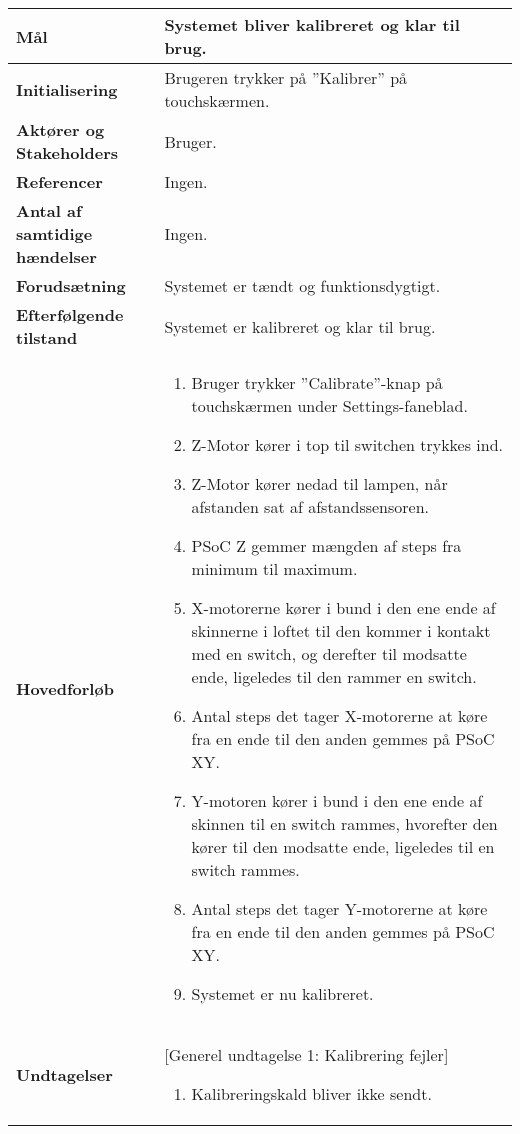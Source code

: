 \begin{center}
\begin{longtable}{|p{6cm}|p{8cm}|}
        \textbf{Mål}								
            & Systemet bliver kalibreret og klar til brug.
        \\ \hline
        \textbf{Initialisering}					
            & Brugeren trykker på ”Kalibrer” på touchskærmen.
        \\ \hline
        \textbf{Aktører og Stakeholders}			
            & Bruger.
        \\ \hline
        \textbf{Referencer}						
            & Ingen.
        \\ \hline
        \textbf{Antal af samtidige hændelser}	
            & Ingen.
        \\ \hline
        \textbf{Forudsætning}					
            & Systemet er tændt og funktionsdygtigt.
        \\ \hline
        \textbf{Efterfølgende tilstand}			
            & Systemet er kalibreret og klar til brug.
        \\ \hline
        \textbf{Hovedforløb}						
            & 
            \begin{enumerate}
                \item Bruger trykker ”Calibrate”-knap på touchskærmen under Settings-faneblad.
                \item Z-Motor kører i top til switchen trykkes ind.
                \item Z-Motor kører nedad til lampen, når afstanden sat af afstandssensoren.
                \item PSoC Z gemmer mængden af steps fra minimum til maximum.
                \item X-motorerne kører i bund i den ene ende af skinnerne i loftet til den kommer i kontakt med en switch, og derefter til modsatte ende, ligeledes til den rammer en switch.
                \item Antal steps det tager X-motorerne at køre fra en ende til den anden gemmes på PSoC XY.
                \item Y-motoren kører i bund i den ene ende af skinnen til en switch rammes, hvorefter den kører til den modsatte ende, ligeledes til en switch rammes.
                \item Antal steps det tager Y-motorerne at køre fra en ende til den anden gemmes på PSoC XY.
                \item Systemet er nu kalibreret.
            \end{enumerate}
        \\ \hline
        \textbf{Undtagelser}						
            & [Generel undtagelse 1: Kalibrering fejler]
            \begin{enumerate}
			    \item Kalibreringskald bliver ikke sendt.
		    \end{enumerate}
        \\ \hline
	\end{longtable}
	\label{UC1} 
\end{center}